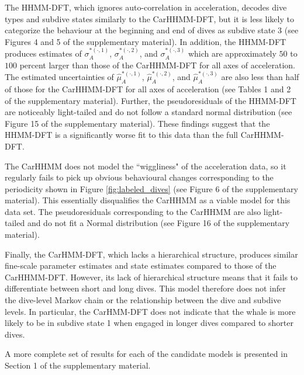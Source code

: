 The HHMM-DFT, which ignores auto-correlation in acceleration, decodes dive types and subdive states similarly to the CarHHMM-DFT, but it is less likely to categorize the behaviour at the beginning and end of dives as subdive state 3 (see Figures 4 and 5 of the supplementary material). In addition, the HHMM-DFT produces estimates of $\sigma_A^{*(\cdot,1)}$, $\sigma_A^{*(\cdot,2)}$, and $\sigma_A^{*(\cdot,3)}$ which are approximately $50$ to $100$ percent larger than those of the CarHHMM-DFT for all axes of acceleration. The estimated uncertainties of $\hat \mu_A^{*(\cdot,1)}$, $\hat \mu_A^{*(\cdot,2)}$, and $\hat \mu_A^{*(\cdot,3)}$ are also less than half of those for the CarHHMM-DFT for all axes of acceleration (see Tables 1 and 2 of the supplementary material). Further, the pseudoresiduals of the HHMM-DFT are noticeably light-tailed and do not follow a standard normal distribution (see Figure 15 of the supplementary material). These findings suggest that the HHMM-DFT is a significantly worse fit to this data than the full CarHHMM-DFT.

The CarHHMM does not model the ``wiggliness" of the acceleration data, so it regularly fails to pick up obvious behavioural changes corresponding to the periodicity shown in Figure \ref{fig:labeled_dives} (see Figure 6 of the supplementary material). This essentially disqualifies the CarHHMM as a viable model for this data set. The pseudoresiduals corresponding to the CarHHMM are also light-tailed and do not fit a Normal distribution (see Figure 16 of the supplementary material).

Finally, the CarHMM-DFT, which lacks a hierarchical structure, produces similar fine-scale parameter estimates and state estimates compared to those of the CarHHMM-DFT. However, its lack of hierarchical structure means that it fails to differentiate between short and long dives. This model therefore does not infer the dive-level Markov chain or the relationship between the dive and subdive levels. In particular, the CarHMM-DFT does not indicate that the whale is more likely to be in subdive state 1 when engaged in longer dives compared to shorter dives. 

A more complete set of results for each of the candidate models is presented in Section 1 of the supplementary material.

